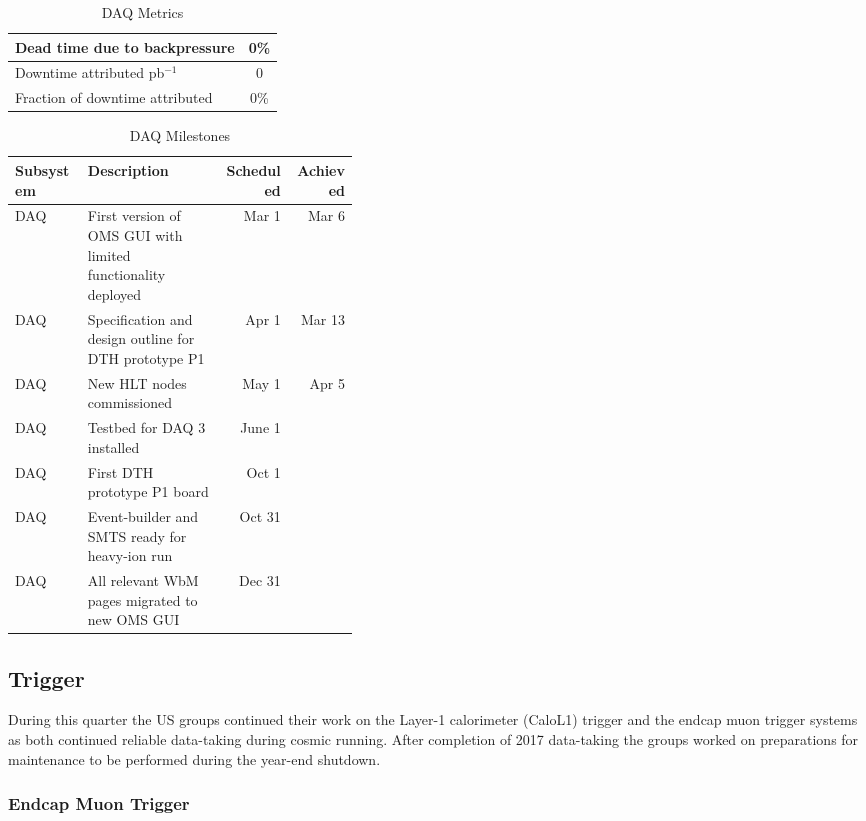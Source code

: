 \documentclass[12pt]{article}
\begin{document}
\begin{table}[htp]
\caption{DAQ Metrics}
\begin{center}
\begin{tabular}{|l|c|}
\hline
Dead time due to backpressure &0\%  \\
\hline
Downtime attributed pb$^{-1}$ &0\\
Fraction of downtime attributed&0\% \\
\hline
\end{tabular}
\end{center}
\label{DAQMetrics}
\end{table}%
\begin{table}[h]
\caption{DAQ Milestones}
\begin{center}
\begin{tabular}{|l|p{0.4\linewidth}|r|r|}
\hline
Subsystem&Description&Scheduled&Achieved\\
\hline
DAQ &First version of OMS GUI with limited functionality deployed	&Mar 1 &Mar 6 \\
\hline
DAQ &Specification and design outline for DTH prototype P1 &Apr 1 & Mar 13 \\
\hline
DAQ &New HLT nodes commissioned &May 1 & Apr 5\\
\hline
DAQ &Testbed for DAQ 3 installed &June 1 & \\
\hline
DAQ &First DTH prototype P1 board &Oct 1 & \\
\hline
DAQ &Event-builder and SMTS ready for heavy-ion run &Oct 31 & \\
\hline
DAQ &All relevant WbM pages migrated to new OMS GUI &Dec 31 & \\
\hline
\end{tabular}
\end{center}
\label{DAQMilestones}
\end{table}%

\subsection{Trigger}
During this quarter the US groups continued their work on the Layer-1 calorimeter (CaloL1) trigger and the endcap muon trigger systems as both continued reliable data-taking during cosmic running. After completion of 2017 data-taking the groups worked on preparations for maintenance to be performed during the year-end shutdown.

\subsubsection{Endcap Muon Trigger}
\end{document}
